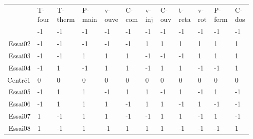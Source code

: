 \makeatletter
\newcommand*{\yncellcolor}{}
\def\yncellcolor\ignorespaces{}
\newcolumntype{m}{>{\yncellcolor}c}
\makeatother

\begin{table}[tbp]
    \centering
    \hspace*{-8mm}
    \begin{tabular}{m|m|m|m|m|m|m|m|m|m|m|m|}
        \arrayrulecolor{black}
        \hhline{~-----------}
        & T-four & T-therm & P-main & v-ouve & C-com & v-inj & C-ouv & t-reta & v-rot & P-ferm & C-dos \\ \hhline{-:=:=:=:=:=:=:=:=:=:=:=} %
        \multicolumn{1}{|r|}{Essai01} & -1     & -1      & -1     & -1     & -1    & -1    & -1    & -1     & -1    & -1     & -1    \\ \hline
        \multicolumn{1}{|r|}{Essai02} & -1     & -1      & -1     & -1     & -1    & 1     & 1     & 1      & 1     & 1      & 1     \\ \hline
        \multicolumn{1}{|r|}{Essai03} & -1     & -1      & 1      & 1      & 1     & -1    & -1    & -1     & 1     & 1      & 1     \\ \hline
        \multicolumn{1}{|r|}{Essai04} & -1     & 1       & -1     & 1      & 1     & -1    & 1     & 1      & -1    & -1     & 1     \\ \hline
        \multicolumn{1}{|r|}{Centré1} & 0      & 0       & 0      & 0      & 0     & 0     & 0     & 0      & 0     & 0      & 0     \\ \hline
        \multicolumn{1}{|r|}{Essai05} & -1     & 1       & 1      & -1     & 1     & 1     & -1    & 1      & -1    & 1      & -1    \\ \hline
        \multicolumn{1}{|r|}{Essai06} & -1     & 1       & 1      & 1      & -1    & 1     & 1     & -1     & 1     & -1     & -1    \\ \hline
        \multicolumn{1}{|r|}{Essai07} & 1      & -1      & 1      & 1      & -1    & -1    & 1     & 1      & -1    & 1      & -1    \\ \hline
        \multicolumn{1}{|r|}{Essai08} & 1      & -1      & 1      & -1     & 1     & 1     & 1     & -1     & -1    & -1     & 1     \\ \hline

\end{tabular}
\end{table}

